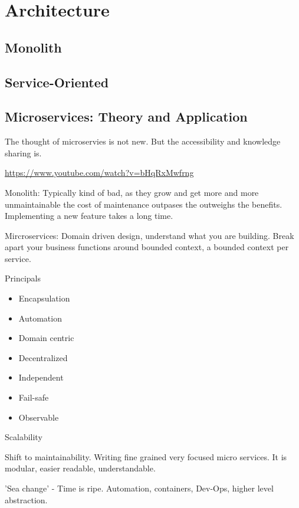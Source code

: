 \chapter{Architecture}
\label{ch:architecture}

\section{Monolith}




\section{Service-Oriented}




\section{Microservices: Theory and Application}
The thought of microservies is not new. But the accessibility and knowledge sharing is.

\url{https://www.youtube.com/watch?v=bHqRxMwfrng}

Monolith:
Typically kind of bad, as they grow and get more and more unmaintainable the cost of maintenance outpases the outweighs the benefits. Implementing a new feature takes a long time.

Mircroservices:
Domain driven design, understand what you are building. Break apart your business functions around bounded context, a bounded context per service.

Principals

\begin{itemize}
\item Encapsulation
\item Automation
\item Domain centric
\item Decentralized
\item Independent
\item Fail-safe
\item Observable
\end{itemize}

Scalability 

Shift to maintainability. Writing fine grained very focused micro services. It is modular, easier readable, understandable.

'Sea change' - Time is ripe. Automation, containers, Dev-Ops, higher level abstraction.

